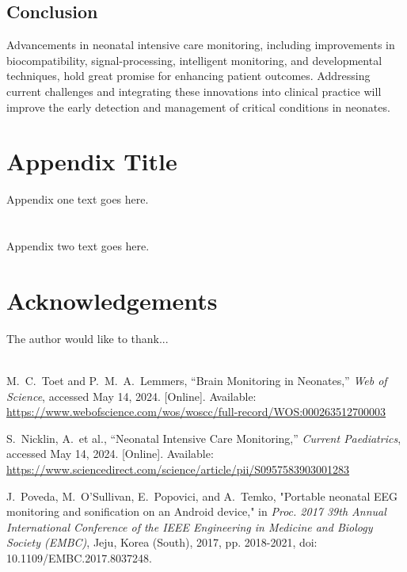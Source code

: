 \documentclass[12pt,journal,compsoc]{IEEEtran}
\begin{document}
\subsection{Conclusion}
Advancements in neonatal intensive care monitoring, including improvements in biocompatibility, signal-processing, intelligent monitoring, and developmental techniques, hold great promise for enhancing patient outcomes. Addressing current challenges and integrating these innovations into clinical practice will improve the early detection and management of critical conditions in neonates.

\appendices
\section{Appendix Title}
Appendix one text goes here.

\section{}
Appendix two text goes here.


\section*{Acknowledgements}

The author would like to thank...\\ \\

\begin{thebibliography}{1}

M.~C.~Toet and P.~M.~A.~Lemmers, “Brain Monitoring in Neonates,” \emph{Web of Science}, accessed May 14, 2024. [Online]. Available: \url{https://www.webofscience.com/wos/woscc/full-record/WOS:000263512700003}

S.~Nicklin, A.~et al., “Neonatal Intensive Care Monitoring,” \emph{Current Paediatrics}, accessed May 14, 2024. [Online]. Available: \url{https://www.sciencedirect.com/science/article/pii/S0957583903001283}

J.~Poveda, M.~O'Sullivan, E.~Popovici, and A.~Temko, "Portable neonatal EEG monitoring and sonification on an Android device," in \emph{Proc. 2017 39th Annual International Conference of the IEEE Engineering in Medicine and Biology Society (EMBC)}, Jeju, Korea (South), 2017, pp. 2018-2021, doi: 10.1109/EMBC.2017.8037248.

\end{thebibliography}
\end{document}

